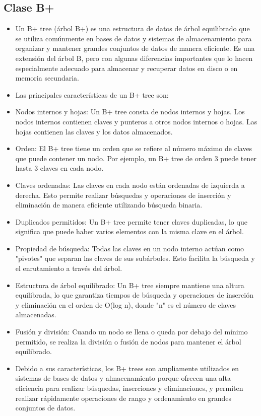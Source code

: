 \documentclass{article}
\begin{document}
	\subsection{Clase B+}
	\begin{itemize}
		\item Un B+ tree (árbol B+) es una estructura de datos de árbol equilibrado que se utiliza comúnmente en bases de datos y sistemas de almacenamiento para organizar y mantener grandes conjuntos de datos de manera eficiente. Es una extensión del árbol B, pero con algunas diferencias importantes que lo hacen especialmente adecuado para almacenar y recuperar datos en disco o en memoria secundaria.

\item Las principales características de un B+ tree son:

\item Nodos internos y hojas: Un B+ tree consta de nodos internos y hojas. Los nodos internos contienen claves y punteros a otros nodos internos o hojas. Las hojas contienen las claves y los datos almacenados.

\item Orden: El B+ tree tiene un orden que se refiere al número máximo de claves que puede contener un nodo. Por ejemplo, un B+ tree de orden 3 puede tener hasta 3 claves en cada nodo.

\item Claves ordenadas: Las claves en cada nodo están ordenadas de izquierda a derecha. Esto permite realizar búsquedas y operaciones de inserción y eliminación de manera eficiente utilizando búsqueda binaria.

\item Duplicados permitidos: Un B+ tree permite tener claves duplicadas, lo que significa que puede haber varios elementos con la misma clave en el árbol.

\item Propiedad de búsqueda: Todas las claves en un nodo interno actúan como "pivotes" que separan las claves de sus subárboles. Esto facilita la búsqueda y el enrutamiento a través del árbol.

\item Estructura de árbol equilibrado: Un B+ tree siempre mantiene una altura equilibrada, lo que garantiza tiempos de búsqueda y operaciones de inserción y eliminación en el orden de O(log n), donde "n" es el número de claves almacenadas.

\item Fusión y división: Cuando un nodo se llena o queda por debajo del mínimo permitido, se realiza la división o fusión de nodos para mantener el árbol equilibrado.

\item Debido a sus características, los B+ trees son ampliamente utilizados en sistemas de bases de datos y almacenamiento porque ofrecen una alta eficiencia para realizar búsquedas, inserciones y eliminaciones, y permiten realizar rápidamente operaciones de rango y ordenamiento en grandes conjuntos de datos.
	\end{itemize}
\end{document}
